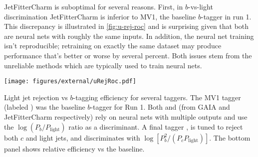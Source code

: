 JetFitterCharm is suboptimal for several reasons.
First, in $b$-vs-light discrimination JetFitterCharm is inferior to MV1, the baseline $b$-tagger in run 1. This discrepancy is illustrated in \cref{fig:u-rej-roc} and is surprising given that both are neural nets with roughly the same inputs.
In addition, the neural net training isn't reproducible; retraining on exactly the same dataset may produce performance that's better or worse by several percent.
Both issues stem from the unreliable methods which are typically used to train neural nets.

\begin{cfig}
    \texttt{[image: figures/external/uRejRoc.pdf]}
    \caption[Light jet rejection as a function of $b$-tagging efficiency]{Light jet rejection vs $b$-tagging efficiency for several taggers. The MV1 tagger (labeled ) was the baseline $b$-tagger for Run 1. Both  and  (from  GAIA and JetFitterCharm respectively) rely on neural nets with multiple outputs and use the $\log (P_{b} / P_{\text{light}})$ ratio as a discriminant. A final tagger , is tuned to reject both $c$ and light jets, and discriminates with $\log [P_{b}^2 / (P_{c} P_{\text{light}})]$.  The bottom panel shows relative efficiency vs the  baseline.}
    \label{fig:u-rej-roc}
\end{cfig}


